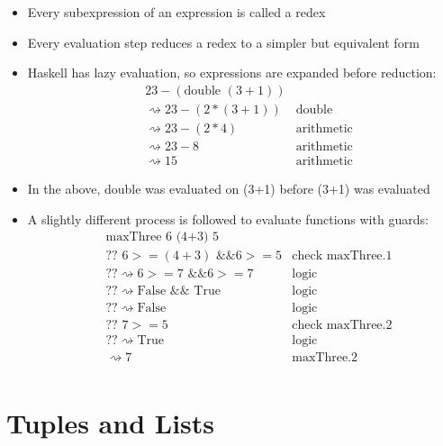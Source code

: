 \documentclass{article}
\begin{document}
\begin{itemize}
\item Every subexpression of an expression is called a redex
\item Every evaluation step reduces a redex to a simpler but equivalent form
\item Haskell has lazy evaluation, so expressions are expanded before reduction:
\begin{align*}
&23 - (\text{double }(3+1)) \\
&\rightsquigarrow 23 - (2*(3+1))            & \text{double} \\
&\rightsquigarrow 23 - (2*4)                & \text{arithmetic} \\
&\rightsquigarrow 23 - 8                    & \text{arithmetic} \\
&\rightsquigarrow 15                        & \text{arithmetic} 
\end{align*}
\item In the above, double was evaluated on (3+1) before (3+1) was evaluated
\item A slightly different process is followed to evaluate functions with
guards:
\begin{align*}
&\text{maxThree  6 (4+3) 5} \\
&\text{?? } 6 >= (4+3) \text{ \&\& } 6 >= 5 		&\text{check maxThree.1}\\
&??\rightsquigarrow 6 >= 7 \text{ \&\& } 6 >= 7 	&\text{logic} \\
&??\rightsquigarrow \text{False } \&\& \text{ True} &\text{logic} \\
&??\rightsquigarrow \text{False } 					&\text{logic} \\
&\text{?? } 7 >= 5 									&\text{check maxThree.2} \\
&??\rightsquigarrow \text{True } 					&\text{logic}	\\		
&\rightsquigarrow 7									&\text{maxThree.2} \\
\end{align*}
\end{itemize}

\section{Tuples and Lists}
\end{document}

